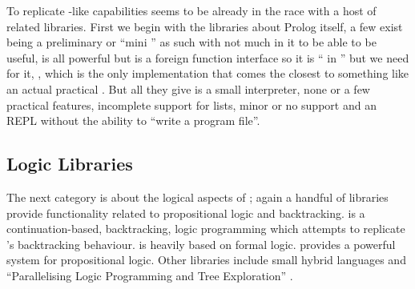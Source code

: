 \documentclass[thesis-solanki.tex]{subfiles}
\begin{document}
To replicate -like
capabilities  seems to be already in the race
with a host of related libraries.
First we begin with the libraries about Prolog
itself,
a few exist \cite{nanoprolog-lib} being a preliminary or
``mini '' as such with not much in it to be able to be useful, \cite{hswip-lib} is all powerful but is a
foreign function interface so it is `` in '' but we need  for it,
\cite{prolog-lib}, which is the only implementation that comes the closest
to something like an actual practical .
But all they give is a small interpreter, none or a few practical features, incomplete support for lists, minor or
no  support and an REPL without the ability to ``write a  program
file''.

\subsection{Logic Libraries}

The next category is about the logical aspects of ; again a handful of libraries provide functionality related
to propositional logic and backtracking.
\cite{logict-lib} is a continuation-based, backtracking, logic programming  which attempts
to replicate
's backtracking behaviour.
 is heavily based on formal logic.
\cite{proplogic-lib} provides a powerful system for propositional logic.
Other libraries include small hybrid languages \cite{cflp-lib} and ``Parallelising Logic Programming and Tree
Exploration'' \cite{logic-grows-on-trees-lib}.
\end{document}
